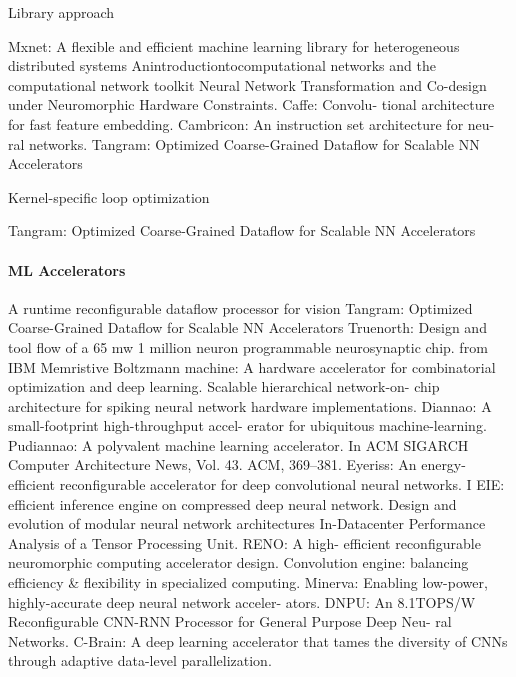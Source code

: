 Library approach
\begin{outline}
\1 Mxnet: A flexible and efficient machine learning library for heterogeneous distributed systems
\1 Anintroductiontocomputational networks and the computational network toolkit
\1 Neural Network Transformation and Co-design under Neuromorphic Hardware Constraints.
\1 Caffe: Convolu- tional architecture for fast feature embedding.
\1 Cambricon: An instruction set architecture for neu- ral networks.
\1 Tangram: Optimized Coarse-Grained Dataflow for Scalable NN Accelerators
\end{outline}

Kernel-specific loop optimization
\begin{outline}
\1 Tangram: Optimized Coarse-Grained Dataflow for Scalable NN Accelerators
\end{outline}

\paragraph{ML Accelerators}
\begin{outline}
\1 A runtime reconfigurable dataflow processor for vision
\1 Tangram: Optimized Coarse-Grained Dataflow for Scalable NN Accelerators
\1 %
\1 Truenorth: Design and tool flow of a 65 mw 1 million neuron programmable neurosynaptic chip. from
IBM
\1 Memristive Boltzmann machine: A hardware accelerator for combinatorial optimization and deep
learning. 
\1 Scalable hierarchical network-on- chip architecture for spiking neural network hardware
implementations. 
\1 Diannao: A small-footprint high-throughput accel- erator for ubiquitous machine-learning.
\1 Pudiannao: A polyvalent machine learning accelerator. In ACM SIGARCH Computer Architecture News, Vol.
43. ACM, 369–381.
\1 Eyeriss: An energy- efficient reconfigurable accelerator for deep convolutional neural networks. I
\1 EIE: efficient inference engine on compressed deep neural network.
\1 Design and evolution of modular neural network architectures
\1 In-Datacenter Performance Analysis of a Tensor Processing Unit. 
\1 RENO: A high- efficient reconfigurable neuromorphic computing accelerator design.
\1 Convolution engine: balancing efficiency \& flexibility in specialized computing.
\1 Minerva: Enabling low-power, highly-accurate deep neural network acceler- ators. 
\1 DNPU: An 8.1TOPS/W Reconfigurable CNN-RNN Processor for General Purpose Deep Neu- ral Networks. 
\1 C-Brain: A deep learning accelerator that tames the diversity of CNNs through adaptive data-level
\1 parallelization. 
\end{outline}

